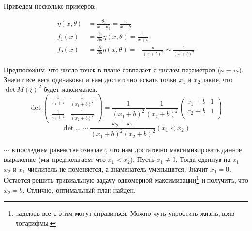 Приведем несколько примеров:
\begin{ex}
\begin{equation}
\label{rationExm1}
\begin{split}
\eta(x,\theta) &= \frac{\theta_1}{x+\theta_2} = \frac{a}{x+b}\\
f_1(x) &= \frac{\partial}{\partial{a}}\eta(x,\theta) = \frac{1}{x+b}\\
f_2(x) &= \frac{\partial}{\partial{b}} \eta(x,\theta) = -\frac{a}{(x+b)^2} \sim \frac{1}{(x+b)^2}
\end{split}
\end{equation}

Предположим, что число точек в плане совпадает с числом параметров ($n=m$). Значит все веса одинаковы и нам достаточно искать точки $x_1$ и $x_2$ такие, что $\det M(\xi)^2$ будет максимален.
\begin{equation}
\det \begin{pmatrix} \frac{1}{x_1 + b} & \frac{1}{(x_1+b)^2} \\ 
\frac{1}{x_2 + b} & \frac{1}{(x_2 + b)^2}
\end{pmatrix} = \frac{1}{(x_1+b)^2}\frac{1}{(x_2+b)^2}\begin{pmatrix}
x_1 + b & 1 \\ 
x_2 + b & 1 \\
\end{pmatrix}
\end{equation}
\begin{equation*}
\det … \sim \frac{x_2 - x_1}{(x_1+b)^2(x_2+b)^2} (x_1 < x_2)
\end{equation*}

$\sim$ в последнем равенстве означает, что нам достаточно максимизировать данное выражение (мы предполагаем, что $x_1 < x_2$). Пусть $x_1 \neq 0$. Тогда сдвинув на $x_1$ $x_2$ и $x_1$ числитель не поменяется, а знаменатель уменьшится. Значит $x_1 = 0$. Остается решить тривиальную задачу одномерной максимизации\footnote{надеюсь все с этим могут справиться. Можно чуть упростить жизнь, взяв логарифмы.} и получить, что $x_2 = b$.
Отлично, оптимальный план найден.

\end{ex}

